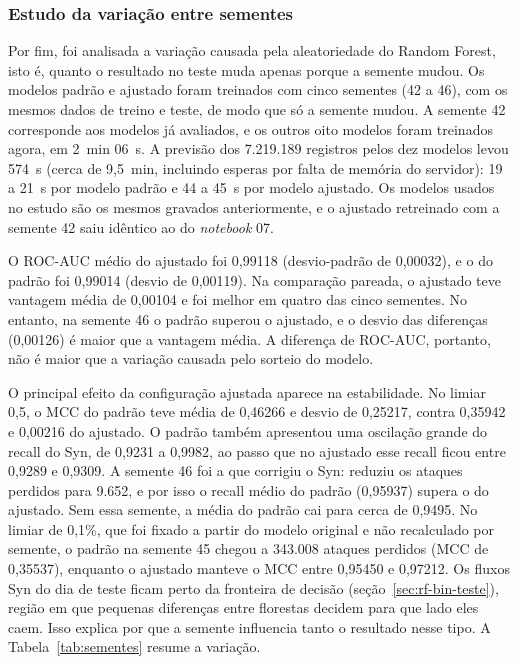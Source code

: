 \documentclass[
    12pt,                %
    openright,           %
    oneside,             %
    a4paper,             %
    english,             %
    brazil               %
]{abntex2}
\begin{document}
\subsubsection{Estudo da variação entre sementes}
\label{sec:rf-bin-sementes}

Por fim, foi analisada a variação causada pela aleatoriedade do Random Forest, isto é, quanto o resultado no teste muda apenas porque a semente mudou. Os modelos padrão e ajustado foram treinados com cinco sementes (42 a 46), com os mesmos dados de treino e teste, de modo que só a semente mudou. A semente 42 corresponde aos modelos já avaliados, e os outros oito modelos foram treinados agora, em 2~min 06~s. A previsão dos 7.219.189 registros pelos dez modelos levou 574~s (cerca de 9,5~min, incluindo esperas por falta de memória do servidor): 19 a 21~s por modelo padrão e 44 a 45~s por modelo ajustado. Os modelos usados no estudo são os mesmos gravados anteriormente, e o ajustado retreinado com a semente 42 saiu idêntico ao do \textit{notebook} 07.

O ROC-AUC médio do ajustado foi 0,99118 (desvio-padrão de 0,00032), e o do padrão foi 0,99014 (desvio de 0,00119). Na comparação pareada, o ajustado teve vantagem média de 0,00104 e foi melhor em quatro das cinco sementes. No entanto, na semente 46 o padrão superou o ajustado, e o desvio das diferenças (0,00126) é maior que a vantagem média. A diferença de ROC-AUC, portanto, não é maior que a variação causada pelo sorteio do modelo.

O principal efeito da configuração ajustada aparece na estabilidade. No limiar 0,5, o MCC do padrão teve média de 0,46266 e desvio de 0,25217, contra 0,35942 e 0,00216 do ajustado. O padrão também apresentou uma oscilação grande do recall do Syn, de 0,9231 a 0,9982, ao passo que no ajustado esse recall ficou entre 0,9289 e 0,9309. A semente 46 foi a que corrigiu o Syn: reduziu os ataques perdidos para 9.652, e por isso o recall médio do padrão (0,95937) supera o do ajustado. Sem essa semente, a média do padrão cai para cerca de 0,9495. No limiar de 0,1\%, que foi fixado a partir do modelo original e não recalculado por semente, o padrão na semente 45 chegou a 343.008 ataques perdidos (MCC de 0,35537), enquanto o ajustado manteve o MCC entre 0,95450 e 0,97212. Os fluxos Syn do dia de teste ficam perto da fronteira de decisão (seção~\ref{sec:rf-bin-teste}), região em que pequenas diferenças entre florestas decidem para que lado eles caem. Isso explica por que a semente influencia tanto o resultado nesse tipo. A Tabela~\ref{tab:sementes} resume a variação.
\end{document}
